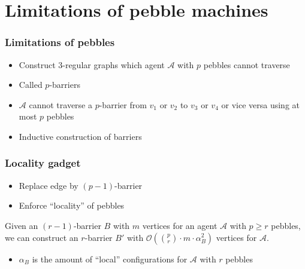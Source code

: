 \documentclass{beamer}
\begin{document}
\section{Limitations of pebble machines}
\begin{frame}
  \frametitle{Limitations of pebbles}
  \begin{itemize}
    \item Construct 3-regular graphs which agent $\mathcal{A}$ with $p$ pebbles
      cannot traverse
    \item Called $p$-barriers
      \begin{center}
        \resizebox{0.6\textwidth}{!}{}
      \end{center}
    \item $\mathcal{A}$ cannot traverse a $p$-barrier from $v_{1}$ or $v_{2}$
      to $v_{3}$ or $v_{4}$ or vice versa using at most $p$ pebbles
    \item Inductive construction of barriers
  \end{itemize}
\end{frame}

\begin{frame}
  \frametitle{Locality gadget}
  \begin{itemize}
    \item Replace edge by $(p-1)$-barrier
    \item Enforce \enquote{locality} of pebbles
      \begin{center}
      \end{center}
  \end{itemize}
\end{frame}

\begin{frame}
  \begin{theorem}
    Given an $(r-1)$-barrier $B$ with $m$ vertices for an agent $\mathcal{A}$
    with $p\geq r$ pebbles, we can construct an $r$-barrier $B'$ with
    $\mathcal{O}(\binom{p}{r}\cdot m\cdot\alpha_{B}^{2})$ vertices for
    $\mathcal{A}$.
  \end{theorem}
  \begin{itemize}
    \item $\alpha_{B}$ is the amount of \enquote{local} configurations for
      $\mathcal{A}$ with $r$ pebbles
  \end{itemize}
\end{frame}
\end{document}

